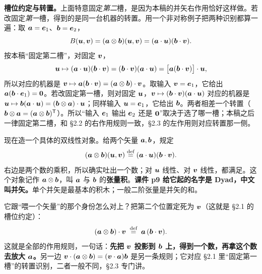 \documentclass[11pt]{ctexart}
\let\origsubhdr\subhdr
\renewcommand{\subhdr}[1]{\par\needspace{3\baselineskip}\origsubhdr{#1}}
\begin{document}
\textbf{槽位约定与转置。}上面特意固定\emph{第二}槽，是因为本稿的并矢右作用恰好这样做。若改固定\emph{第一}槽，得到的是同一台机器的转置。用一个非对称例子把两种识别都算一遍：取 $\boldsymbol{a}=\boldsymbol{e}_1$、$\boldsymbol{b}=\boldsymbol{e}_2$，
\[
B(\boldsymbol{u},\boldsymbol{v})=(\boldsymbol{a}\otimes\boldsymbol{b})(\boldsymbol{u},\boldsymbol{v})=(\boldsymbol{a}\cdot\boldsymbol{u})(\boldsymbol{b}\cdot\boldsymbol{v}).
\]
按本稿“固定第二槽”，对固定 $\boldsymbol{v}$，
\[
\boldsymbol{u}\mapsto(\boldsymbol{a}\cdot\boldsymbol{u})(\boldsymbol{b}\cdot\boldsymbol{v})=(\boldsymbol{b}\cdot\boldsymbol{v})(\boldsymbol{a}\cdot\boldsymbol{u})
=\bigl[\boldsymbol{a}(\boldsymbol{b}\cdot\boldsymbol{v})\bigr]\cdot\boldsymbol{u} ,
\]
所以对应的机器是 $\boldsymbol{v}\mapsto\boldsymbol{a}(\boldsymbol{b}\cdot\boldsymbol{v})=(\boldsymbol{a}\otimes\boldsymbol{b})\cdot\boldsymbol{v}$。取输入 $\boldsymbol{v}=\boldsymbol{e}_1$，它给出 $\boldsymbol{a}(\boldsymbol{b}\cdot\boldsymbol{e}_1)=\boldsymbol{0}$。若改固定第一槽，则对固定 $\boldsymbol{u}$，$\boldsymbol{v}\mapsto(\boldsymbol{b}\cdot\boldsymbol{v})(\boldsymbol{a}\cdot\boldsymbol{u})$ 对应的机器是 $\boldsymbol{u}\mapsto\boldsymbol{b}(\boldsymbol{a}\cdot\boldsymbol{u})=(\boldsymbol{b}\otimes\boldsymbol{a})\cdot\boldsymbol{u}$；同样输入 $\boldsymbol{u}=\boldsymbol{e}_1$，它给出 $\boldsymbol{b}$。两者相差一个转置（$\boldsymbol{b}\otimes\boldsymbol{a}=(\boldsymbol{a}\otimes\boldsymbol{b})^{\mathsf T}$）。所以“输入 $\boldsymbol{e}_1$ 输出 $\boldsymbol{e}_2$ 还是 $\boldsymbol{0}$”取决于选了哪一槽；本稿之后一律固定第二槽，和 \S2.2 的右作用规则一致，\S2.3 的左作用则对应转置那一侧。

\label{subsec:dyad}

现在造一个具体的双线性对象。给两个矢量 $\boldsymbol{a},\boldsymbol{b}$，规定
\[
(\boldsymbol{a}\otimes\boldsymbol{b})(\boldsymbol{u},\boldsymbol{v})\stackrel{\text{def}}{=}(\boldsymbol{a}\cdot\boldsymbol{u})(\boldsymbol{b}\cdot\boldsymbol{v}).
\]
右边是两个数的乘积，所以确实吐出一个数；对 $\boldsymbol{u}$ 线性、对 $\boldsymbol{v}$ 线性，都满足。这个对象记作 $\boldsymbol{a}\otimes\boldsymbol{b}$，叫 $\boldsymbol{a}$ 与 $\boldsymbol{b}$ 的\textbf{张量积}。\textbf{课件 p9 给它起的名字是 Dyad，中文叫并矢。}单个并矢是最基本的积木；一般二阶张量是并矢的和。

它跟“喂一个矢量”的那个身份怎么对上？把第二个位置定死为 $\boldsymbol{v}$（这就是 \S2.1 的槽位约定）：
\[
(\boldsymbol{a}\otimes\boldsymbol{b})\cdot\boldsymbol{v}\;\stackrel{\text{def}}{=}\;\boldsymbol{a}\,(\boldsymbol{b}\cdot\boldsymbol{v}).
\]
这就是全部的作用规则，一句话：\textbf{先把 $\boldsymbol{v}$ 投影到 $\boldsymbol{b}$ 上，得到一个数，再拿这个数去放大 $\boldsymbol{a}$。}另一边 $\boldsymbol{v}\cdot(\boldsymbol{a}\otimes\boldsymbol{b})=(\boldsymbol{v}\cdot\boldsymbol{a})\boldsymbol{b}$ 是另一条规则；它对应 \S2.1 里“固定第一槽”的转置识别，二者一般不同，\S2.3 专门讲。
\end{document}
